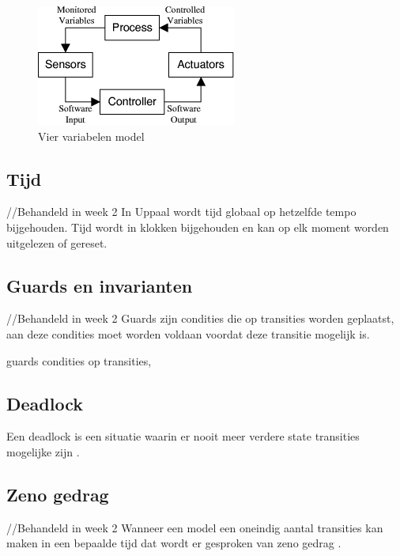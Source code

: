 \documentclass{article}
\begin{document}
\begin{figure}[!h]
	\centering
	\includegraphics[width=\textwidth]{four_Variables}
    \caption{Vier variabelen model \cite{thompson2000requirements}}
	\label{fig:four_Variables}
\end{figure}

\subsection{Tijd}
//Behandeld in week 2 \newline
In Uppaal wordt tijd globaal op hetzelfde tempo bijgehouden. Tijd wordt in klokken bijgehouden en kan op elk moment worden uitgelezen of gereset. \cite{uppaalsmalltutorial}
\subsection{Guards en invarianten}
//Behandeld in week 2 \newline 
Guards zijn condities die op transities worden geplaatst, aan deze condities moet worden voldaan voordat deze transitie mogelijk is.\cite{uppaalsmalltutorial}


guards condities op transities, 

\subsection{Deadlock}

Een deadlock is een situatie waarin er nooit meer verdere state transities mogelijke zijn \cite{uppaalintro}.

\subsection{Zeno gedrag}
//Behandeld in week 2 \newline
Wanneer een model een oneindig aantal transities kan maken in een bepaalde tijd dat wordt er gesproken van zeno gedrag \cite{uppaaltutorialmodelingpatterns} \cite{leine2011zeno}.
\end{document}
